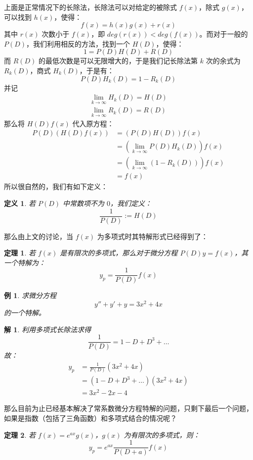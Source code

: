 \documentclass{article}
\newtheorem{thm}{定理}[section]
\newtheorem{definition}{定义}[section]
\newtheorem{exm}{例}[section]
\newtheorem*{sol}{解}
\begin{document}
\noindent 上面是正常情况下的长除法，长除法可以对给定的被除式 $f(x)$，除式 $g(x)$，可以找到 $h(x)$，使得：
$$
f(x) = h(x)g(x)+r(x)
$$
其中 $r(x)$ 次数小于 $f(x)$，即 $deg(r(x))<deg(f(x))$。而对于一般的 $P(D)$，我们利用相反的方法，找到一个 $H(D)$，使得：
$$
1 = P(D)H(D) + R(D)
$$
而 $R(D)$ 的最低次数是可以无限增大的，于是我们记长除法第 $k$ 次的余式为 $R_k(D)$，商式 $H_k(D)$，于是有：
$$
P(D)H_k(D) = 1 - R_k(D)
$$
并记
\begin{align*}
    \lim_{k\to \infty}H_k(D) = H(D) \\ \lim_{k\to \infty} R_k(D) = R(D)
\end{align*}
那么将 $H(D)f(x)$ 代入原方程：
\begin{align*}
    P(D)\left(H(D)f(x)\right)&=\left(P(D)H(D)\right)f(x)\\
    &=\left(\lim_{k\to \infty}P(D)H_k(D)\right)f(x)\\
    &=\left(\lim_{k\to \infty}(1-R_k(D))\right)f(x)\\
    &=f(x)
\end{align*}
所以很自然的，我们有如下定义：
\begin{definition}
若 $P(D)$ 中常数项不为 $0$，我们定义：
$$
\frac{1}{P(D)} := H(D)
$$
\end{definition}
\noindent 那么由上文的讨论，当 $f(x)$ 为多项式时其特解形式已经得到了：
\begin{thm}
若 $f(x)$ 是有限次的多项式，那么对于微分方程 $P(D)y = f(x)$，其一个特解为：
$$
y_p = \frac{1}{P(D)}f(x)
$$
\end{thm}
\begin{exm}
求微分方程
$$
y''+y'+y = 3x^2+4x
$$
的一个特解。
\end{exm}
\begin{sol}
利用多项式长除法求得
$$
\frac{1}{P(D)} = 1-D+D^3+\ldots
$$
故：
\begin{align*}
    y_p &= \frac{1}{P(D)}(3x^2+4x)\\
    &= (1-D+D^3+\ldots)(3x^2+4x)\\
    &= 3x^2-2x-4
\end{align*}
\end{sol}

\noindent 那么目前为止已经基本解决了常系数微分方程特解的问题，只剩下最后一个问题，如果是指数（包括了三角函数）和多项式结合的情况呢？

\begin{thm}
若 $f(x) = e^{ax}g(x)$，$g(x)$ 为有限次的多项式，则：
$$
y_p = e^{ax}\frac{1}{P(D+a)}f(x)
$$
\end{thm}
\end{document}
